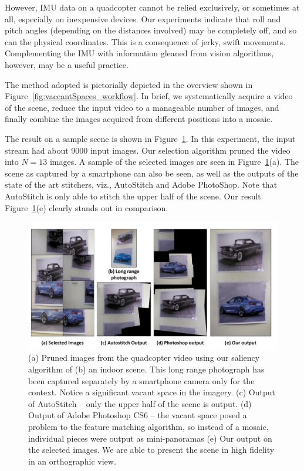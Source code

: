 However, IMU data on a quadcopter cannot be relied exclusively, or sometimes at
all, especially on inexpensive devices. Our experiments indicate that roll
and pitch angles (depending on the distances involved) may be completely off,
and so can the physical coordinates.  This is a consequence of jerky,
swift movements.  Complementing the IMU with information gleaned from
vision algorithms, however, may be a useful practice.

The method adopted is pictorially depicted in the overview shown in
Figure~\ref{fig:vaccantSpaces_workflow}.  In
brief, we systematically acquire a video of the scene, reduce the
input video to a manageable number of images, and finally combine the
images acquired from different positions into a mosaic. 

The result on a sample scene is shown in Figure~\ref{fig:vacantSpaces_result}.
In this experiment, the input stream had about 9000 input images.  Our selection algorithm
 pruned the video into $N=13$ images. A sample of the selected images are seen
 in Figure~\ref{fig:vacantSpaces_result}(a).  The scene as captured by a
 smartphone can also be seen, as well as the outputs of the state of the art
 stitchers, viz., AutoStitch\cite{autostitch} and Adobe
 PhotoShop\cite{photoshop}. Note that AutoStitch\cite{autostitch} is only able
 to stitch the upper half of the scene.  Our result
 Figure~\ref{fig:vacantSpaces_result}(e) clearly stands out in comparison.\\
  
  \begin{figure}[h!]
	\centering
	\includegraphics[width=0.98\linewidth]{figures/vacantSpaces/indoor_results}
	\caption[Result: Cars]{ (a) Pruned images from the quadcopter video using our
  saliency algorithm of (b) an indoor scene. This long range photograph
  has been captured separately by a smartphone camera only for the
  context. Notice a significant vacant space in the imagery.  (c)
  Output of AutoStitch -- only the upper half of the scene is output.
  (d) Output of Adobe Photoshop CS6 -- the vacant space posed a problem to the
  feature matching algorithm, so instead of a mosaic, individual
  pieces were output as mini-panoramas (e) Our output on the selected
  images. We are able to present the scene in high fidelity in an
  orthographic view.}	
	\label{fig:vacantSpaces_result}
	\end{figure}
  
